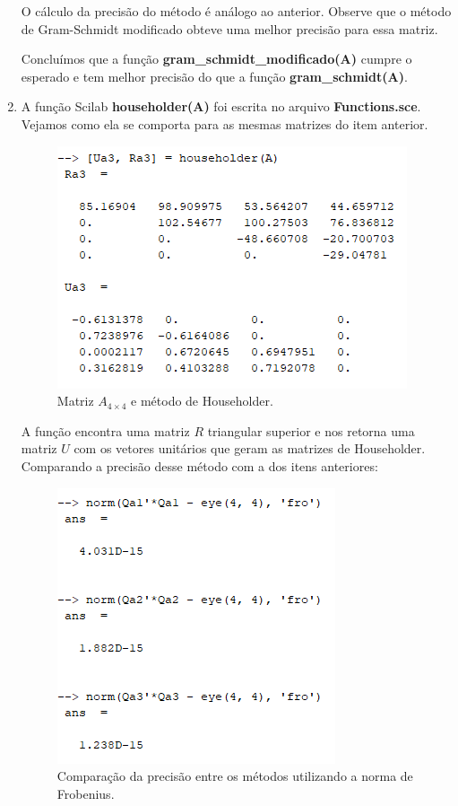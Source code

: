 \documentclass[11pt]{article}
\begin{document}
\begin{enumerate}
            O cálculo da precisão do método é análogo ao anterior. Observe que o método de Gram-Schmidt modificado obteve uma melhor precisão para essa matriz.
            
            Concluímos que a função \textbf{gram\_schmidt\_modificado(A)} cumpre o esperado e tem melhor precisão do que a função \textbf{gram\_schmidt(A)}.
        
        \bigbreak
        
        \item %
        
            A função Scilab \textbf{householder(A)} foi escrita no arquivo \textbf{Functions.sce}. Vejamos como ela se comporta para as mesmas matrizes do item anterior.
        
            \begin{figure}[H]
                \centering
                \includegraphics[]{3-1}
                \caption{Matriz $A_{4\times4}$ e método de Householder.}
            \end{figure}
        
            A função encontra uma matriz $R$ triangular superior e nos retorna uma matriz $U$ com os vetores unitários que geram as matrizes de Householder. Comparando a precisão desse método com a dos itens anteriores:
        
            \begin{figure}[H]
                \centering
                \includegraphics[]{3-2}
                \caption{Comparação da precisão entre os métodos utilizando a norma de Frobenius.}
            \end{figure}
            

\end{enumerate}
\end{document}
